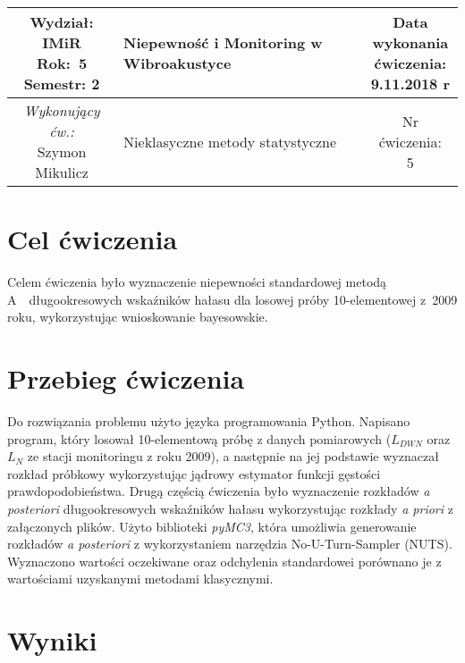 \documentclass[polish,a4paper,11pt]{mwart}
\let\Oldsection\section
\renewcommand{\section}{\FloatBarrier\Oldsection}
\begin{document}
\begin{table}[h] %
  \centering
  \begin{tabular}{ | c |  >{\centering\arraybackslash}m{5.5cm} | c | }
    \hline
    \makecell{ \textbf{Wydział:} \\ IMiR \\ \textbf{Rok:}~5 \\ Semestr: 2 } &
    \textbf{\large{Niepewność i Monitoring w Wibroakustyce}} &
    \makecell{Data \\ wykonania \\ ćwiczenia: \\ 9.11.2018 r} \\ \hline
    \makecell{\emph{Wykonujący ćw.:} \\ Szymon Mikulicz } &
    \large{Nieklasyczne metody statystyczne} &
    \makecell{Nr ćwiczenia: \\ 5} \\ \hline
  \end{tabular}
\end{table}

\section{Cel ćwiczenia}
Celem ćwiczenia było wyznaczenie niepewności standardowej metodą A~\
długookresowych wskaźników hałasu dla losowej próby 10-elementowej z~2009
roku, wykorzystując wnioskowanie bayesowskie.

\section{Przebieg ćwiczenia}
Do rozwiązania problemu użyto języka programowania Python. Napisano
program, który losował 10-elementową próbę z danych pomiarowych ($L_{DWN}$
oraz $L_N$ ze stacji monitoringu z roku 2009), a następnie na jej podstawie
wyznaczał rozkład próbkowy wykorzystując jądrowy estymator funkcji gęstości
prawdopodobieństwa. 
Drugą częścią ćwiczenia było wyznaczenie rozkładów \textit{a posteriori}
długookresowych wskaźników hałasu wykorzystując rozkłady \textit{a priori}
z załączonych plików. Użyto biblioteki \textit{pyMC3}, która umożliwia
generowanie rozkładów \textit{a posteriori} z wykorzystaniem narzędzia
No-U-Turn-Sampler (NUTS). Wyznaczono wartości oczekiwane oraz odchylenia
standardowei porównano je z wartościami uzyskanymi metodami klasycznymi.

\section{Wyniki}
\end{document}
